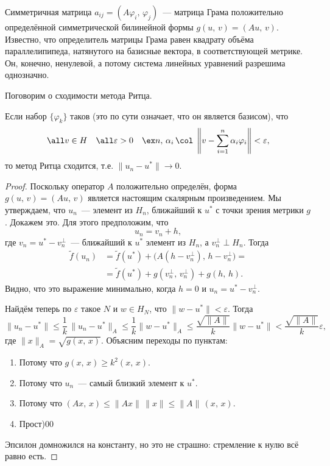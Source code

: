 \documentclass{trlnotes}
\begin{document}
    \begin{rem}
        Симметричная матрица $a_{ij} = (A\varphi_i, \, \varphi_j)$~--- матрица Грама положительно определённой симметрической билинейной формы $g(u, \, v) = (Au, \, v)$. Известно, что определитель матрицы Грама равен квадрату объёма параллелипипеда, натянутого на базисные вектора, в соответствующей метрике. Он, конечно, ненулевой, а потому система линейных уравнений разрешима однозначно.
    \end{rem}

    Поговорим о сходимости метода Ритца.

    \begin{st}\label{st:rietz-conv-1}
        Если набор $\{\varphi_k\}$ таков (это по сути означает, что он является базисом), что
        \[
            \all v \in H \quad \all \varepsilon > 0 \quad \ex n, \, \alpha_i \, \col \; \left\|v - \sum\limits_{i = 1}^n \alpha_i \varphi_i \right\| < \varepsilon,
        \]
        то метод Ритца сходится, т.е. $\|u_n - u^*\| \to 0$.
        \begin{proof}
            Поскольку оператор $A$ положительно определён, форма $g(u, \, v) = (Au, \, v)$ является настоящим скалярным произведением. Мы утверждаем, что $u_n$~--- элемент из $H_n$, ближайший к $u^*$ с точки зрения метрики $g$. Докажем это. Для этого предположим, что
            \[
                u_n = v_n + h,
            \]
            где $v_n = u^* - v_n^{\perp}$~--- ближайший к $u^*$ элемент из $H_n$, а $v_n^{\perp} \perp H_n$. Тогда
            \begin{align*}
                \tilde{f}(u_n) &= \tilde{f}(u^*) + \big(A(h - v_n^\perp), \, h - v_n^\perp\big) = \\ &= \tilde{f}(u^*) + g(v_n^{\perp}, \, v_n^{\perp}) + g(h, \, h).
            \end{align*}
            Видно, что это выражение минимально, когда $h = 0$ и $u_n = u^* - v_n^{\perp}$.

            Найдём теперь по $\varepsilon$ такое $N$ и $w \in H_N$, что $\|w - u^*\| < \varepsilon$. Тогда
            \[
                \|u_n - u^*\| \leqslant \dfrac{1}{k} \, \|u_n - u^*\|_A \leqslant \dfrac{1}{k} \|w - u^*\|_A \leqslant \dfrac{\sqrt{\|A\|}}{k} \|w - u^*\| < \dfrac{\sqrt{\|A\|}}{k} \varepsilon,
            \]
            где $\|x\|_A = \sqrt{g(x, \, x)}$. Объясним переходы по пунктам:
            \begin{enumerate}
                \item Потому что $g(x, \, x) \geqslant k^2 (x, \, x)$.
                \item Потому что $u_n$~--- самый близкий элемент к $u^*$.
                \item Потому что $(Ax, \, x) \leqslant \|Ax\| \, \|x\| \leqslant \|A\| \, (x, \, x)$.
                \item Прост)00
            \end{enumerate}
            Эпсилон домножился на константу, но это не страшно: стремление к нулю всё равно есть.
        \end{proof}
    \end{st}
\end{document}

